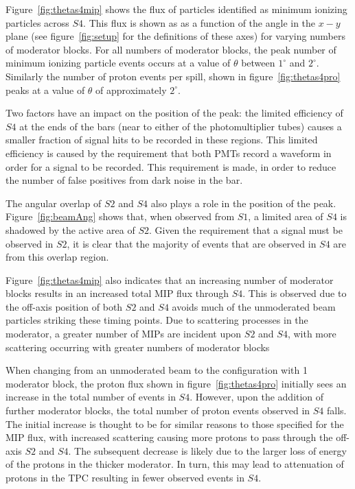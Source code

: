	Figure~\ref{fig:thetas4mip} shows the flux of particles identified as minimum ionizing particles across $S4$.
	This flux is shown as as a function of the angle in the $x-y$ plane (see figure~\ref{fig:setup} for the definitions of these axes) for varying numbers of moderator blocks.
	For all numbers of moderator blocks, the peak number of minimum ionizing particle events occurs at a value of $\theta$ between $1^{\circ}$ and $2^{\circ}$.
	Similarly the number of proton events per spill, shown in figure~\ref{fig:thetas4pro} peaks at a value of $\theta$ of approximately $2^{\circ}$.
	
	Two factors have an impact on the position of the peak:
	the limited efficiency of $S4$ at the ends of the bars (near to either of the photomultiplier tubes) causes a smaller fraction of signal hits to be recorded in these regions. 
	This limited efficiency is caused by the requirement that both PMTs record a waveform in order for a signal to be recorded.
	This requirement is made, in order to reduce the number of false positives from dark noise in the bar.
	
	The angular overlap of $S2$ and $S4$ also plays a role in the position of the peak. 
	Figure~\ref{fig:beamAng} shows that, when observed from $S1$, a limited area of $S4$ is shadowed by the active area of $S2$.
	Given the requirement that a signal must be observed in $S2$, it is clear that the majority of events that are observed in $S4$ are from this overlap region.
   
   	Figure~\ref{fig:thetas4mip} also indicates that an increasing number of moderator blocks results in an increased total MIP flux through $S4$.
   	This is observed due to the off-axis position of both $S2$ and $S4$ avoids much of the unmoderated beam particles striking these timing points.
   	Due to scattering processes in the moderator, a greater number of MIPs are incident upon $S2$ and $S4$, with more scattering occurring with greater numbers of moderator blocks
   	
   	When changing from an unmoderated beam to the configuration with 1 moderator block, the proton flux shown in figure~\ref{fig:thetas4pro} initially sees an increase in the total number of events in $S4$.
   	However, upon the addition of further moderator blocks, the total number of proton events observed in $S4$ falls.
   	The initial increase is thought to be for similar reasons to those specified for the MIP flux, with increased scattering causing more protons to pass through the off-axis $S2$ and $S4$.
   	The subsequent decrease is likely due to the larger loss of energy of the protons in the thicker moderator.
   	In turn, this may lead to attenuation of protons in the TPC resulting in fewer observed events in $S4$.
   

